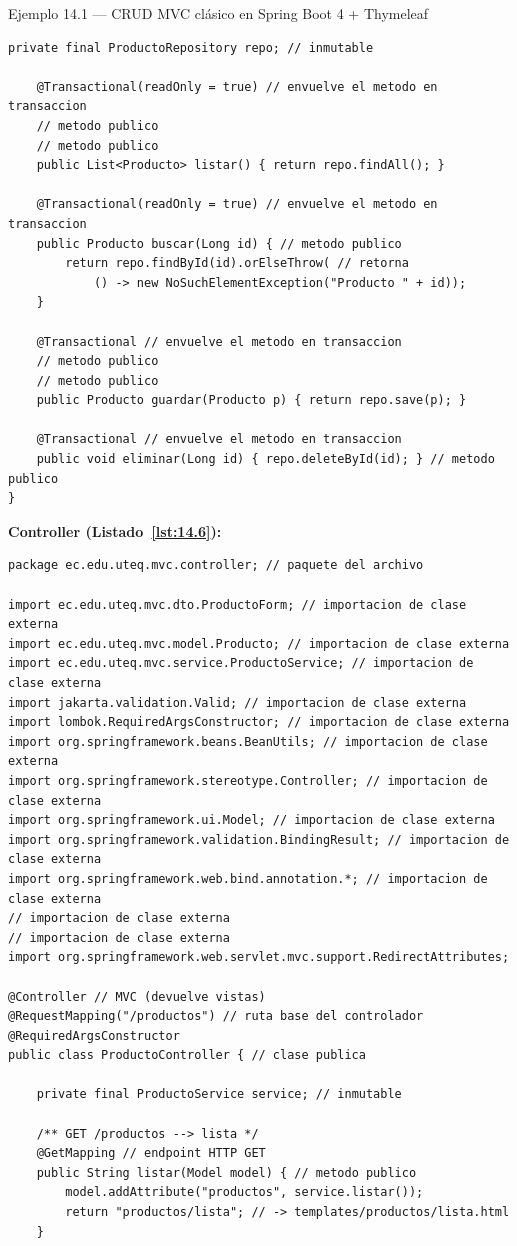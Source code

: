 \begin{cajaejemplo}{Ejemplo 14.1 --- CRUD MVC clásico en Spring Boot 4 + Thymeleaf}
\begin{lstlisting}[style=java,caption={ProductoService.java},label=lst:14.5]
    private final ProductoRepository repo; // inmutable

    @Transactional(readOnly = true) // envuelve el metodo en transaccion
    // metodo publico
    // metodo publico
    public List<Producto> listar() { return repo.findAll(); }

    @Transactional(readOnly = true) // envuelve el metodo en transaccion
    public Producto buscar(Long id) { // metodo publico
        return repo.findById(id).orElseThrow( // retorna
            () -> new NoSuchElementException("Producto " + id));
    }

    @Transactional // envuelve el metodo en transaccion
    // metodo publico
    // metodo publico
    public Producto guardar(Producto p) { return repo.save(p); }

    @Transactional // envuelve el metodo en transaccion
    public void eliminar(Long id) { repo.deleteById(id); } // metodo publico
}
\end{lstlisting}

\textbf{Controller (Listado~\ref{lst:14.6}):}
\begin{lstlisting}[style=java,caption={ProductoController.java},label=lst:14.6]
package ec.edu.uteq.mvc.controller; // paquete del archivo

import ec.edu.uteq.mvc.dto.ProductoForm; // importacion de clase externa
import ec.edu.uteq.mvc.model.Producto; // importacion de clase externa
import ec.edu.uteq.mvc.service.ProductoService; // importacion de clase externa
import jakarta.validation.Valid; // importacion de clase externa
import lombok.RequiredArgsConstructor; // importacion de clase externa
import org.springframework.beans.BeanUtils; // importacion de clase externa
import org.springframework.stereotype.Controller; // importacion de clase externa
import org.springframework.ui.Model; // importacion de clase externa
import org.springframework.validation.BindingResult; // importacion de clase externa
import org.springframework.web.bind.annotation.*; // importacion de clase externa
// importacion de clase externa
// importacion de clase externa
import org.springframework.web.servlet.mvc.support.RedirectAttributes;

@Controller // MVC (devuelve vistas)
@RequestMapping("/productos") // ruta base del controlador
@RequiredArgsConstructor
public class ProductoController { // clase publica

    private final ProductoService service; // inmutable

    /** GET /productos --> lista */
    @GetMapping // endpoint HTTP GET
    public String listar(Model model) { // metodo publico
        model.addAttribute("productos", service.listar());
        return "productos/lista"; // -> templates/productos/lista.html
    }


\end{lstlisting}
\end{cajaejemplo}
